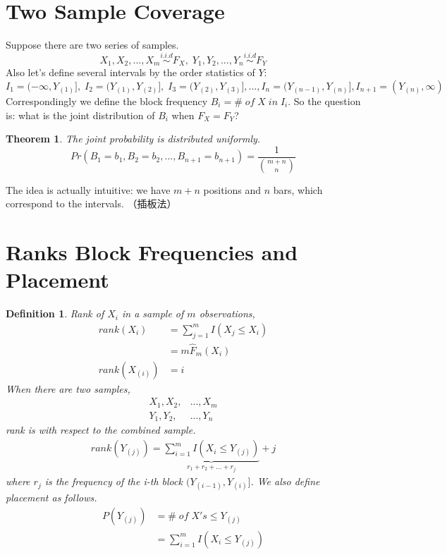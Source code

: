 \documentclass[twoside]{article}
\newtheorem*{theorem*}{Theorem}
\newtheorem*{definition*}{Definition}
\begin{document}
	\section{Two Sample Coverage}
	Suppose there are two series of samples. 
	$$
	X_1, X_2, ..., X_m \stackrel{i.i.d}{\sim} F_X, \; Y_1, Y_2, ..., Y_n \stackrel{i.i.d}{\sim} F_Y
	$$
	Also let's define several intervals by the order statistics of $Y$: 
	$$
	I_1 = (- \infty, Y_{(1)}], \; I_2 = (Y_{(1)}, Y_{(2)}], \; I_3 = (Y_{(2)}, Y_{(3)}], ..., I_n = (Y_{(n-1)}, Y_{(n)}], I_{n+1} = (Y_{(n)}, \infty)
	$$
	Correspondingly we define the block frequency $B_i = \# \; of \; X \; in \; I_i$. So the question is: what is the joint distribution of $B_i$ when $F_X = F_Y$?
	\begin{theorem*}
		The joint probability is distributed uniformly. 
		$$
		Pr \left( B_1 = b_1, B_2 = b_2, ..., B_{n+1} = b_{n+1} \right) = \frac{1}{\binom{m+n}{n}}
		$$
	\end{theorem*}
	The idea is actually intuitive: we have $m+n$ positions and $n$ bars, which correspond to the intervals. （插板法）
	
	\section{Ranks Block Frequencies and Placement}
	\begin{definition*}
		Rank of $X_i$ in a sample of $m$ observations, 
		\begin{align*}
			rank \left( X_i \right) &= \sum_{j=1}^{m} I \left( X_j \leqslant X_i \right) \\
			&= m \hat{F}_m \left( X_i \right) \\
			rank \left( X_{(i)} \right) &= i
		\end{align*}
		When there are two samples, 
		\begin{align*}
			X_1, X_2, &..., X_m \\
			Y_1, Y_2, &..., Y_n
		\end{align*}
		rank is with respect to the combined sample. 
		\begin{align*}
			rank \left( Y_{(j)} \right) = \underbrace{\sum_{i=1}^{m} I \left( X_i \leqslant Y_{(j)} \right) }_{r_1 + r_2 + ... + r_j} + j
		\end{align*}
		where $r_j$ is the frequency of the i-th block $(Y_{(i-1)}, Y_{(i)}]$. We also define placement as follows. 
		\begin{align*}
			P \left( Y_{(j)} \right) &= \# \; of \; X's \leqslant Y_{(j)} \\
			&= \sum_{i=1}^{m} I \left( X_i \leqslant Y_{(j)} \right)
		\end{align*}
	\end{definition*}
	
\end{document}
